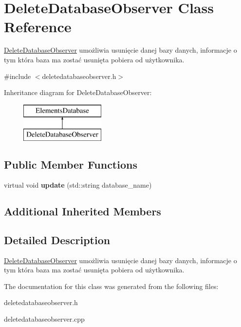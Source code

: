 \hypertarget{class_delete_database_observer}{}\section{Delete\+Database\+Observer Class Reference}
\label{class_delete_database_observer}


\mbox{\hyperlink{class_delete_database_observer}{Delete\+Database\+Observer}} umożliwia usunięcie danej bazy danych, informacje o tym która baza ma zostać usunięta pobiera od użytkownika.  




{\ttfamily \#include $<$deletedatabaseobserver.\+h$>$}

Inheritance diagram for Delete\+Database\+Observer\+:\begin{figure}[H]
\begin{center}
\leavevmode
\includegraphics[height=2.000000cm]{class_delete_database_observer}
\end{center}
\end{figure}
\subsection*{Public Member Functions}
\begin{DoxyCompactItemize}
\item 
\mbox{\label{class_delete_database_observer_aac4b2fa8fd6c4d160fd39e2d3fb0d1a0}} 
virtual void {\bfseries update} (std\+::string database\+\_\+name)
\end{DoxyCompactItemize}
\subsection*{Additional Inherited Members}


\subsection{Detailed Description}
\mbox{\hyperlink{class_delete_database_observer}{Delete\+Database\+Observer}} umożliwia usunięcie danej bazy danych, informacje o tym która baza ma zostać usunięta pobiera od użytkownika. 

The documentation for this class was generated from the following files\+:\begin{DoxyCompactItemize}
\item 
deletedatabaseobserver.\+h\item 
deletedatabaseobserver.\+cpp\end{DoxyCompactItemize}
